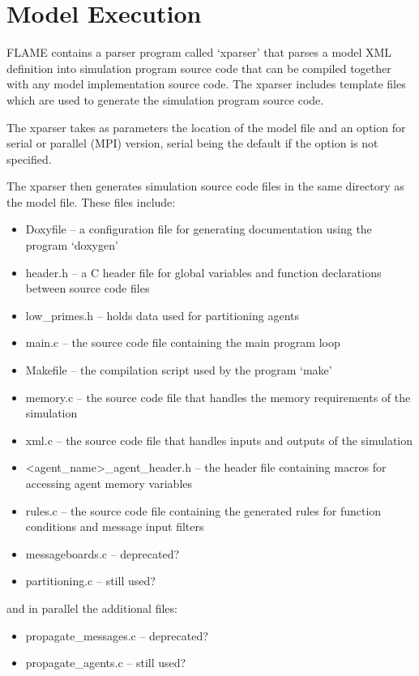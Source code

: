 \section{Model Execution}
\label{model_execution}

FLAME contains a parser program called `xparser' that parses a model
XML definition into simulation program source code that can be compiled
together with any model implementation source code. The xparser includes
template files which are used to generate the simulation program source code.

The xparser takes as parameters the location of the model file and an option
for serial or parallel (MPI) version, serial being the default if the option is
not specified.

The xparser then generates simulation source code files in the same directory
as the model file. These files include:

\begin{itemize}
  \item Doxyfile -- a configuration file for generating documentation using
 the program `doxygen'
  \item header.h -- a C header file for global variables and function
  declarations between source code files
  \item low\_primes.h -- holds data used for partitioning agents
  \item main.c -- the source code file containing the main program loop
  \item Makefile -- the compilation script used by the program `make'
  \item memory.c -- the source code file that handles the memory requirements
  of the simulation
  \item xml.c -- the source code file that handles inputs and outputs of the
  simulation
  \item <agent\_name>\_agent\_header.h -- the header file containing macros for
  accessing agent memory variables
  \item rules.c -- the source code file containing the generated rules for
  function conditions and message input filters
  \item messageboards.c -- deprecated?
  \item partitioning.c -- still used?
\end{itemize}

and in parallel the additional files:

\begin{itemize}
  \item propagate\_messages.c -- deprecated?
  \item propagate\_agents.c -- still used?
\end{itemize}

